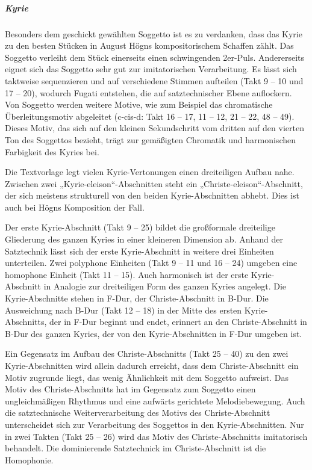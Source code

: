 \documentclass[a4paper]{article}
\begin{document}
\subparagraph{Kyrie}
Besonders dem geschickt gewählten Soggetto ist es zu verdanken, dass das
Kyrie zu den besten Stücken in August Högns kompositorischem Schaffen
zählt. Das Soggetto verleiht dem Stück einerseits einen schwingenden
2er-Puls. Andererseits eignet sich das Soggetto sehr gut zur
imitatorischen Verarbeitung. Es lässt sich taktweise sequenzieren und
auf verschiedene Stimmen aufteilen (Takt 9 – 10 und 17 – 20), wodurch
Fugati entstehen, die auf satztechnischer Ebene auflockern. Von
Soggetto werden weitere Motive, wie zum Beispiel das chromatische
Überleitungsmotiv abgeleitet (c-cis-d: Takt 16 – 17, 11 – 12, 21 – 22,
48 – 49). Dieses Motiv, das sich auf den kleinen Sekundschritt vom
dritten auf den vierten Ton des Soggettos bezieht, trägt zur gemäßigten
Chromatik und harmonischen Farbigkeit des Kyries bei.

Die Textvorlage legt vielen Kyrie-Vertonungen einen dreiteiligen Aufbau
nahe. Zwischen zwei „Kyrie-eleison“-Abschnitten steht ein
„Christe-eleison“-Abschnitt, der sich meistens strukturell von den
beiden Kyrie-Abschnitten abhebt. Dies ist auch bei Högns Komposition
der Fall.

Der erste Kyrie-Abschnitt (Takt 9 – 25) bildet die großformale
dreiteilige Gliederung des ganzen Kyries in einer kleineren Dimension
ab. Anhand der Satztechnik lässt sich der erste Kyrie-Abschnitt in
weitere drei Einheiten unterteilen. Zwei polyphone Einheiten (Takt 9 –
11 und 16 – 24) umgeben eine homophone Einheit (Takt 11 – 15). Auch
harmonisch ist der erste Kyrie-Abschnitt in Analogie zur dreiteiligen
Form des ganzen Kyries angelegt. Die Kyrie-Abschnitte stehen in F-Dur,
der Christe-Abschnitt in B-Dur. Die Ausweichung nach B-Dur (Takt 12 –
18) in der Mitte des ersten Kyrie-Abschnitts, der in F-Dur beginnt und
endet, erinnert an den Christe-Abschnitt in B-Dur des ganzen Kyries,
der von den Kyrie-Abschnitten in F-Dur umgeben ist.

Ein Gegensatz im Aufbau des Christe-Abschnitts (Takt 25 – 40) zu den
zwei Kyrie-Abschnitten wird allein dadurch erreicht, dass dem
Christe-Abschnitt ein Motiv zugrunde liegt, das wenig Ähnlichkeit mit
dem Soggetto aufweist. Das Motiv des Christe-Abschnitts hat im
Gegensatz zum Soggetto einen ungleichmäßigen Rhythmus und eine aufwärts
gerichtete Melodiebewegung. Auch die satztechnische Weiterverarbeitung
des Motivs des Christe-Abschnitt unterscheidet sich zur Verarbeitung
des Soggettos in den Kyrie-Abschnitten. Nur in zwei Takten (Takt 25 –
26) wird das Motiv des Christe-Abschnitts imitatorisch behandelt. Die
dominierende Satztechnick im Christe-Abschnitt ist die Homophonie.
\end{document}
